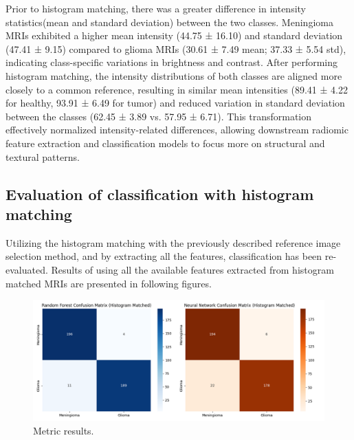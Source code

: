 \documentclass[11pt,a4paper]{article}
\begin{document}
Prior to histogram matching, there was a greater difference in intensity statistics(mean and standard deviation)
between the two classes. 
Meningioma MRIs exhibited a higher mean intensity (44.75 ± 16.10) and 
standard deviation (47.41 ± 9.15) compared to glioma MRIs (30.61 ± 7.49 mean; 37.33 ± 5.54 std), 
indicating class-specific variations in brightness and contrast. 
After performing histogram matching, the intensity distributions of both classes are aligned more closely 
to a common reference, resulting in similar mean intensities (89.41 ± 4.22 for healthy, 93.91 ± 6.49 for tumor) 
and reduced variation in standard deviation between the classes (62.45 ± 3.89 vs. 57.95 ± 6.71). 
This transformation effectively normalized intensity-related differences, allowing downstream radiomic feature 
extraction and classification models to focus more on structural and textural patterns.


\subsection{Evaluation of classification with histogram matching}

		Utilizing the histogram matching with the previously described reference image selection method,
		and by extracting all the features, classification has been re-evaluated.
		Results of using all the available features extracted from histogram matched MRIs 
		are presented in following figures.
		\begin{figure}[H]
			\centering
			\includegraphics[width=1.1\textwidth]{images/metrics_hm.png}
			\caption{Metric results.}
			\label{fig1:}
		\end{figure}		
\end{document}
